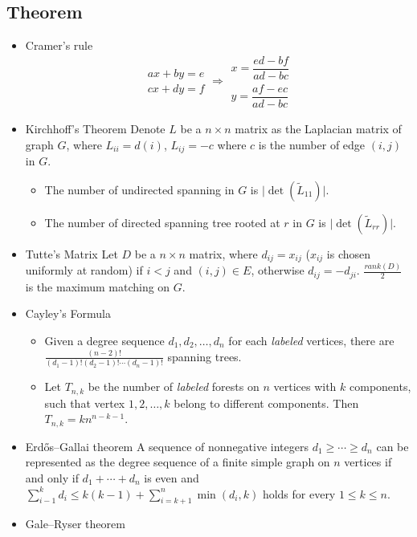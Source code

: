 \documentclass[10pt, a4paper, twocolumn, oneside]{article}
\begin{document}
\subsection{Theorem}
\begin{itemize}
\item Cramer's rule
$$
\begin{aligned}ax+by=e\\cx+dy=f\end{aligned}
\Rightarrow
\begin{aligned}x=\dfrac{ed-bf}{ad-bc}\\y=\dfrac{af-ec}{ad-bc}\end{aligned}
$$
\item Kirchhoff's Theorem
Denote $L$ be a $n \times n$ matrix as the Laplacian matrix of graph $G$, where $L_{ii} = d(i)$, $L_{ij} = -c$ where $c$ is the number of edge $(i, j)$ in $G$.
\begin{itemize}
    \itemsep-0.5em
    \item The number of undirected spanning in $G$ is $\lvert \det(\tilde{L}_{11}) \rvert$.
    \item The number of directed spanning tree rooted at $r$ in $G$ is $\lvert \det(\tilde{L}_{rr}) \rvert$.
\end{itemize}
\item Tutte's Matrix
Let $D$ be a $n \times n$ matrix, where $d_{ij} = x_{ij}$ ($x_{ij}$ is chosen uniformly at random) if $i < j$ and $(i, j) \in E$, otherwise $d_{ij} = -d_{ji}$. $\frac{rank(D)}{2}$ is the maximum matching on $G$.
\item Cayley's Formula
\begin{itemize}
    \itemsep-0.5em
  \item Given a degree sequence $d_1, d_2, \ldots, d_n$ for each \textit{labeled} vertices, there are $\frac{(n - 2)!}{(d_1 - 1)!(d_2 - 1)!\cdots(d_n - 1)!}$ spanning trees.
  \item Let $T_{n, k}$ be the number of \textit{labeled} forests on $n$ vertices with $k$ components, such that vertex $1, 2, \ldots, k$ belong to different components. Then $T_{n, k} = kn^{n - k - 1}$.
\end{itemize}
\item Erdős–Gallai theorem 
A sequence of nonnegative integers $d_1\ge\cdots\ge d_n$ can be represented as the degree sequence of a finite simple graph on $n$ vertices if and only if $d_1+\cdots+d_n$ is even and $\displaystyle\sum_{i-1}^kd_i\le k(k-1)+\displaystyle\sum_{i=k+1}^n\min(d_i,k)$ holds for every $1\le k\le n$.
\item Gale–Ryser theorem

\end{itemize}
\end{document}
